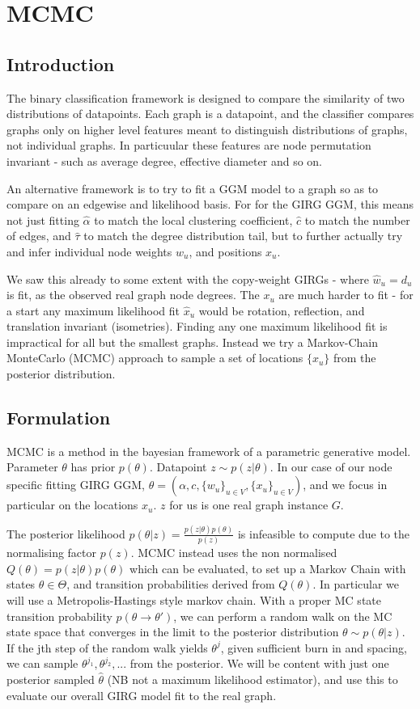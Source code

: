 \chapter{MCMC}
\section{Introduction}
The binary classification framework is designed to compare the similarity of two distributions of datapoints. Each graph is a datapoint, and the classifier compares graphs only on higher level features meant to distinguish distributions of graphs, not individual graphs. In particuular these features are node permutation invariant - such as average degree, effective diameter and so on.

An alternative framework is to try to fit a GGM model to a graph so as to compare on an edgewise and likelihood basis. For for the GIRG GGM, this means not just fitting $\hat{\alpha}$ to match the local clustering coefficient, $\hat{c}$ to match the number of edges, and $\hat{\tau}$ to match the degree distribution tail, but to further actually try and infer individual node weights $w_u$, and positions $x_u$. 

We saw this already to some extent with the copy-weight GIRGs - where $\hat{w}_u = d_u$ is fit, as the observed real graph node degrees. The $x_u$ are much harder to fit - for a start any maximum likelihood fit $\hat{x}_u$ would be rotation, reflection, and translation invariant (isometries). Finding any one maximum likelihood fit is impractical for all but the smallest graphs. Instead we try a Markov-Chain MonteCarlo (MCMC) approach to sample a set of locations $\{x_u\}$ from the posterior distribution.

\section{Formulation}
MCMC is a method in the bayesian framework of a parametric generative model. Parameter $\theta$ has prior $p(\theta)$. Datapoint $z \sim p(z | \theta)$. In our case of our node specific fitting GIRG GGM, $\theta = (\alpha, c, \{w_u\}_{u \in V}, \{x_u\}_{u \in V})$, and we focus in particular on the locations $x_u$. $z$ for us is one real graph instance $G$.

The posterior likelihood $p(\theta | z) = \frac{p(z | \theta) p(\theta)}{p(z)}$ is infeasible to compute due to the normalising factor $p(z)$. MCMC instead uses the non normalised $Q(\theta) = p(z | \theta) p(\theta)$ which can be evaluated, to set up a Markov Chain with states $\theta \in \Theta$, and transition probabilities derived from $Q(\theta)$. In particular we will use a Metropolis-Hastings style markov chain. With a proper MC state transition probability $p(\theta \to \theta')$, we can perform a random walk on the MC state space that converges in the limit to the posterior distribution $\theta \sim p(\theta | z)$. If the jth step of the random walk yields $\theta^j$, given sufficient burn in and spacing, we can sample $\theta^{j_1}, \theta^{j_2}, ...$ from the posterior. We will be content with just one posterior sampled $\hat{\theta}$ (NB not a maximum likelihood estimator), and use this to evaluate our overall GIRG model fit to the real graph.

